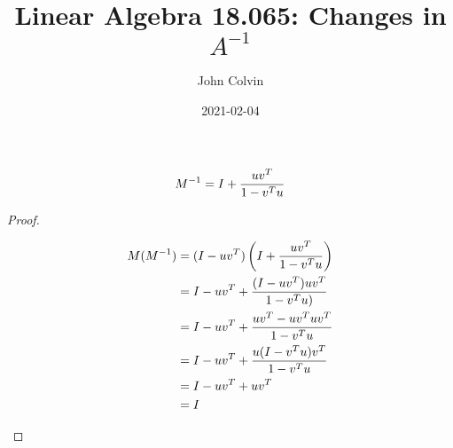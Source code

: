 \documentclass{article}
\title{Linear Algebra 18.065: Changes in $A^{-1}$}
\date{2021-02-04}
\author{John Colvin}
\begin{document}
\maketitle
\begin{fact}
  \begin{equation}
    M^{-1}=I+{uv^T\over 1-v^Tu}
  \end{equation}
\end{fact}
\begin{proof}
  \begin{flushleft}
    \begin{align*}
      M(M^{-1}) & =(I-uv^T)\left(I+{uv^T \over 1-v^Tu}\right) \\
                & =I-uv^T+{(I-uv^T)uv^T\over 1-v^Tu)}         \\
                & =I-uv^T+{uv^T-uv^Tuv^T\over 1-v^Tu}         \\
                & =I-uv^T+{u(I-v^Tu)v^T\over 1-v^Tu}          \\
                & =I-uv^T+uv^T                                \\
                & =I
    \end{align*}
  \end{flushleft}
\end{proof}
\end{document}
